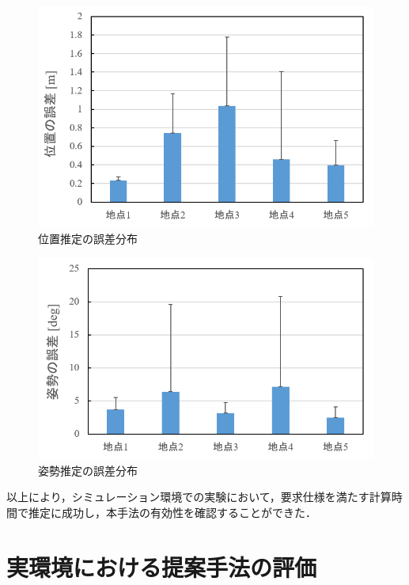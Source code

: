 \begin{figure}[b]
 \begin{center}
 \includegraphics[width=0.7\columnwidth]{./chap5/fig/result1.png}
 \caption{位置推定の誤差分布}
 \label{fig:result1}
 \end{center}
 \vspace{-5mm}
\end{figure}

\begin{figure}[tb]
 \begin{center}
 \includegraphics[width=0.7\columnwidth]{./chap5/fig/result2.png}
 \caption{姿勢推定の誤差分布}
 \label{fig:result2}
 \end{center}
 \vspace{-5mm}
\end{figure}

以上により，シミュレーション環境での実験において，要求仕様を満たす計算時間で推定に成功し，本手法の有効性を確認することができた．

\clearpage
\section{実環境における提案手法の評価}

